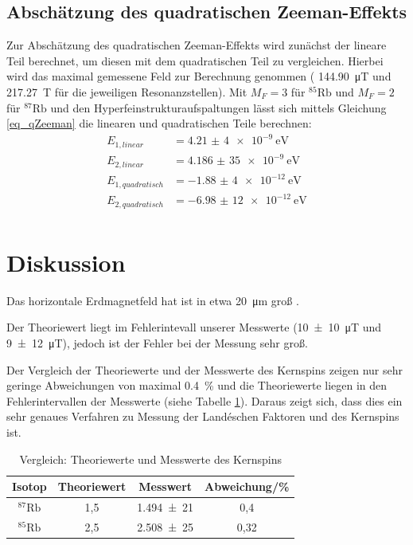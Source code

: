 \subsection{Abschätzung des quadratischen Zeeman-Effekts}
Zur Abschätzung des quadratischen Zeeman-Effekts wird zunächst der lineare Teil
berechnet, um diesen mit dem quadratischen Teil zu vergleichen. Hierbei wird das
maximal gemessene Feld zur Berechnung genommen ( \SI{144,90}{\micro\tesla} und
\SI{217,27}{\tesla} für die jeweiligen Resonanzstellen). Mit $M_F=3$ für
$^{85}\text{Rb}$ und $M_F=2$ für $^{87}\text{Rb}$ und den
Hyperfeinstrukturaufspaltungen \cite{Q1} lässt sich mittels Gleichung \eqref{eq_qZeeman}
die linearen und quadratischen Teile berechnen:
\begin{align*}
  E_{1, linear} &= \SI{4,21(4)e-9}{\eV} \\
  E_{2, linear} &= \SI{4,186(35)e-9}{\eV} \\
  E_{1, quadratisch} &= \SI{-1,88(4)e-12}{\eV} \\
  E_{2, quadratisch} &= \SI{-6,98(12)e-12}{\eV} \\
\end{align*}

\section{Diskussion}
Das horizontale Erdmagnetfeld hat ist in etwa \SI{20}{\micro\meter} groß \cite{Q3}.

Der Theoriewert liegt im Fehlerintevall unserer Messwerte
(\SI{10(10)}{\micro\tesla} und \SI{9(12)}{\micro\tesla}), jedoch ist der Fehler
bei der Messung sehr groß.

Der Vergleich der Theoriewerte und der Messwerte des Kernspins zeigen nur sehr
geringe Abweichungen von maximal \SI{0,4}{\percent} und die Theoriewerte liegen
in den Fehlerintervallen der Messwerte (siehe Tabelle \ref{tab:diskussion}).
Daraus zeigt sich, dass dies ein sehr genaues Verfahren zu Messung der
Landéschen Faktoren und des Kernspins ist.

\begin{table}
  \centering
  \caption{Vergleich: Theoriewerte und Messwerte des Kernspins}
  \label{tab:diskussion}
  \begin{tabular}{c| c c c}
    \toprule
    Isotop & Theoriewert & Messwert & Abweichung/\si{\percent}\\
    \midrule
    $^{87}\text{Rb}$ & 1,5 &  \num{1,494(21)} & 0,4 \\
    $^{85}\text{Rb}$ & 2,5 &  \num{2,508(25)} & 0,32 \\
    \bottomrule
  \end{tabular}
\end{table}


